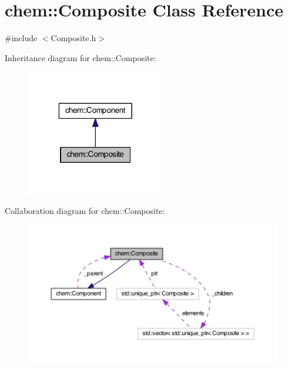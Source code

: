 \hypertarget{classchem_1_1Composite}{\section{chem\-:\-:Composite Class Reference}
\label{classchem_1_1Composite}
}


{\ttfamily \#include $<$Composite.\-h$>$}



Inheritance diagram for chem\-:\-:Composite\-:\nopagebreak
\begin{figure}[H]
\begin{center}
\leavevmode
\includegraphics[width=172pt]{classchem_1_1Composite__inherit__graph}
\end{center}
\end{figure}


Collaboration diagram for chem\-:\-:Composite\-:\nopagebreak
\begin{figure}[H]
\begin{center}
\leavevmode
\includegraphics[width=350pt]{classchem_1_1Composite__coll__graph}
\end{center}
\end{figure}
